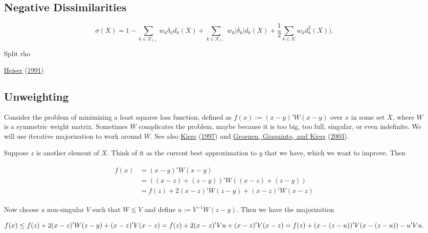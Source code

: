 \documentclass[
  12pt,
]{book}
\theoremstyle{definition}
\theoremstyle{definition}
\theoremstyle{definition}
\theoremstyle{definition}
\theoremstyle{remark}
\begin{document}
\hypertarget{negative-dissimilarities}{%
\subsection{Negative Dissimilarities}\label{negative-dissimilarities}}

\begin{equation}
\sigma(X)=1-\sum_{k\in\mathcal{K}_{1+}} w_k\delta_kd_k(X)
+\sum_{k\in\mathcal{K}_{1-}} w_k|\delta_k|d_k(X)+\frac12\sum_{k\in\mathcal{K}} w_kd_k^2(X)).
\label{eq:disneg}
\end{equation}

Split rho

\protect\hyperlink{ref-heiser_91}{Heiser} (\protect\hyperlink{ref-heiser_91}{1991})

\hypertarget{minunweight}{%
\subsection{Unweighting}\label{minunweight}}

Consider the problem of minimizing a least squares loss function, defined as \(f(x):=(x-y)'W(x-y)\) over \(x\) in some set \(X\), where \(W\) is a symmetric weight matrix. Sometimes \(W\) complicates the problem, maybe because it is too big, too full, singular, or even indefinite. We will use iterative majorization to work around \(W\). See also \protect\hyperlink{ref-kiers_97}{Kiers} (\protect\hyperlink{ref-kiers_97}{1997}) and \protect\hyperlink{ref-groenen_giaquinto_kiers_03}{Groenen, Giaquinto, and Kiers} (\protect\hyperlink{ref-groenen_giaquinto_kiers_03}{2003}).

Suppose \(z\) is another element of \(X\). Think of it as the current best approximation to \(y\) that we have, which we want to improve. Then

\begin{align}
\begin{split}
f(x)&=(x-y)'W(x-y)\\
&=((x-z)+(z-y))'W((x-z)+(z-y))\\
&=f(z)+2(x-z)'W(z-y)+(x-z)'W(x-z)
\end{split}
\label{eq:unwgth}
\end{align}

Now choose a non-singular \(V\) such that \(W\lesssim V\) and define \(u:=V^{-1}W(z-y)\). Then we have the majorization

\begin{equation}
f(x)\leq f(z)+2(x-z)'W(z-y)+(x-z)'V(x-z)=\\
f(z)+2(x-z)'Vu+(x-z)'V(x-z)=\\
f(z)+(x-(z-u))'V(x-(z-u))-u'Vu.
\label{eq:compsq}
\end{equation}
\end{document}
